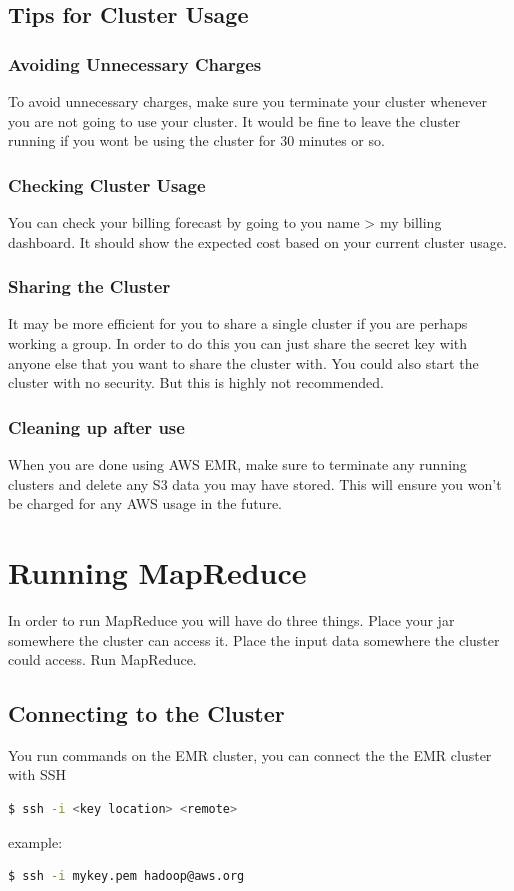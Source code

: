 \documentclass{article}
\begin{document}
\subsection{Tips for Cluster Usage}
\subsubsection{Avoiding Unnecessary Charges}
To avoid unnecessary charges, make sure you terminate your cluster whenever you are not going to use your cluster. It would be fine to leave the cluster running if you wont be using the cluster for 30 minutes or so.
\subsubsection{Checking Cluster Usage}
You can check your billing forecast by going to you name > my billing dashboard. It should show the expected cost based on your current cluster usage.
\subsubsection{Sharing the Cluster}
It may be more efficient for you to share a single cluster if you are perhaps working a group. In order to do this you can just share the secret key with anyone else that you want to share the cluster with. You could also start the cluster with no security. But this is highly not recommended.
\subsubsection{Cleaning up after use}
When you are done using AWS EMR, make sure to terminate any running clusters and delete any S3 data you may have stored. This will ensure you won't be charged for any AWS usage in the future.



\section{Running MapReduce}
In order to run MapReduce you will have do three things. Place your jar somewhere the cluster can access it. Place the input data somewhere the cluster could access. Run MapReduce. 
\subsection{Connecting to the Cluster}
You run commands on the EMR cluster, you can connect the the EMR cluster with SSH
\begin{lstlisting}[language=bash]
  $ ssh -i <key location> <remote>
\end{lstlisting}
example:
\begin{lstlisting}[language=bash]
  $ ssh -i mykey.pem hadoop@aws.org
\end{lstlisting}
\end{document}

